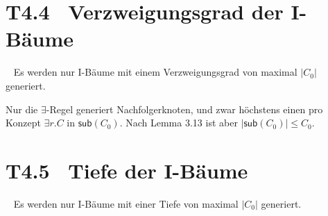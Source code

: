 \documentclass[fontsize=11pt, twoside=false, numbers=autoenddot]{scrbook}
\begin{document}
\section*{T4.4~ Verzweigungsgrad der I-Bäume}

~
Es werden nur I-Bäume mit einem
Verzweigungsgrad von maximal $|C_0|$ generiert.

\par\noindent
\begin{beweis}
  Nur die $\exists$-Regel generiert Nachfolgerknoten,
  und zwar höchstens einen pro Konzept $\exists r.C$ in $\textsf{sub}(C_0)$.
  Nach Lemma 3.13 ist aber $|\textsf{sub}(C_0)| \leq C_0$.
  \qedhere
\end{beweis}%

\section*{T4.5~ Tiefe der I-Bäume}

~
Es werden nur I-Bäume mit einer
Tiefe von maximal $|C_0|$ generiert.
\end{document}
